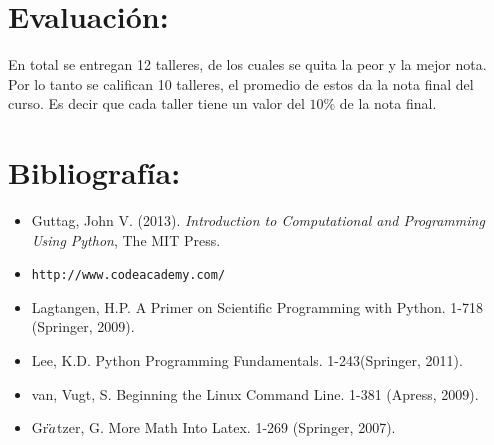 \documentclass[letterpaper]{article}
\begin{document}
\section*{Evaluaci\'on:}

En total se entregan 12 talleres, de los cuales se quita la peor y la mejor nota.
Por lo tanto se califican 10 talleres, el promedio de estos da la nota final del curso. Es decir que
cada taller tiene un valor del $10\%$ de la nota final.

\section*{Bibliograf\'ia:}
\begin{itemize}
\item Guttag, John V. (2013). \textit{Introduction to Computational and Programming Using Python}, The MIT Press.
\item \verb"http://www.codeacademy.com/"
\item Lagtangen, H.P. A Primer on Scientific Programming with Python. 1-718 (Springer, 2009).
\item Lee, K.D. Python Programming Fundamentals. 1-243(Springer, 2011).
\item van, Vugt, S. Beginning the Linux Command Line. 1-381 (Apress, 2009).
\item Gr$\ddot \rm{a}$tzer, G. More Math Into Latex. 1-269 (Springer, 2007).
\end{itemize}
\end{document}
